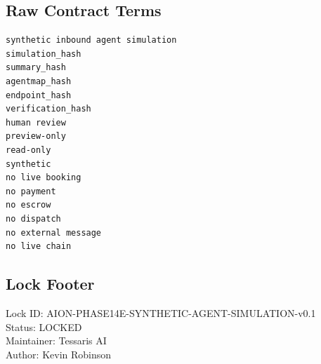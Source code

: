 \subsection{Raw Contract Terms}

\begin{verbatim}
synthetic inbound agent simulation
simulation_hash
summary_hash
agentmap_hash
endpoint_hash
verification_hash
human review
preview-only
read-only
synthetic
no live booking
no payment
no escrow
no dispatch
no external message
no live chain
\end{verbatim}

\subsection{Lock Footer}

Lock ID: AION-PHASE14E-SYNTHETIC-AGENT-SIMULATION-v0.1\\
Status: LOCKED\\
Maintainer: Tessaris AI\\
Author: Kevin Robinson

